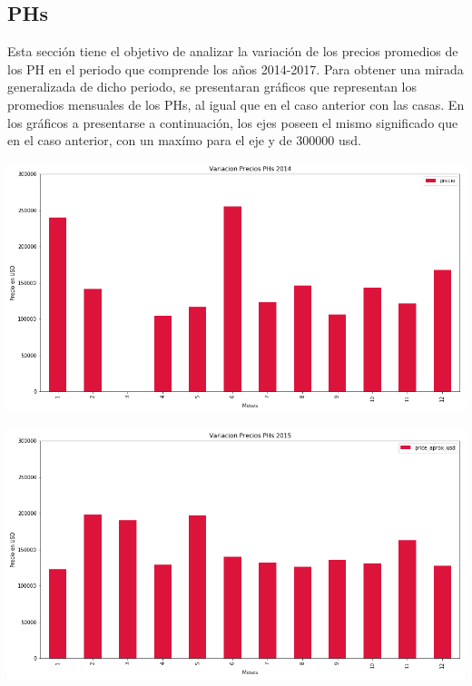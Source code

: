 \documentclass[a4paper, 10pt]{article}
\begin{document}
			\subsection{PHs}
			
			
			Esta sección tiene el objetivo de analizar la variación de los precios promedios de los PH en el periodo que comprende los años 2014-2017. Para obtener una mirada generalizada de dicho periodo, se presentaran gráficos que representan los promedios mensuales de los PHs, al igual que en el caso anterior con las casas. En los gráficos a presentarse a continuación, los ejes poseen el mismo significado que en el caso anterior, con un maxímo para el eje y de 300000 usd. 

			\begin{center}
   		    		\includegraphics[width=\textwidth]{images/vPH2014}
			\end{center}

			\begin{center}
   		    		\includegraphics[width=\textwidth]{images/vPH2015}
			\end{center}			
			
\end{document}
